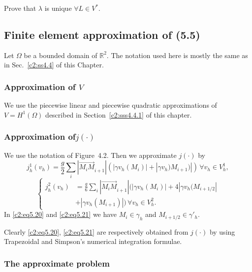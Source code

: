  \begin{exercise}\label{c2:exer5.2}%
Prove that $\lambda$ is unique $\forall L \in V^*$. 
  \end{exercise}  

 \subsection{Finite element approximation of (5.5)}\label{c2:ss5.4}
  Let $\Omega$ be a bounded domain of $\mathbb{R}^2$. The notation
  used here is mostly the same as in Sec.~\ref{c2:ss4.4} of this Chapter.  
\subsubsection{Approximation of $V$}\label{c2:sss5.4.1}
We use the piecewise  linear and
piecewise quadratic approximations of $V = H^1(\Omega)$ described in
Section~\ref{c2:sss4.4.1} of this chapter. 
\subsubsection{Approximation of$j (\cdot)$}\label{c2:sss5.4.2} 
We use the notation of  Figure~4.2. Then we approximate $j(\cdot)$ by  
\begin{equation}
j^1_h(v_h) = \frac{g}{2} \sum_i |\overrightarrow{M_i M}_{i+1}|
(|\gamma v_h(M_i)  | + |\gamma v_h )M_{i+1})|)\, \forall  v_h \in
V^1_h, \tag{5.20}\label{c2:eq5.20}  
\end{equation} 
\begin{equation}
\begin{cases}
j^2_h (v_h) & = \frac{g}{6}\sum_i |\overrightarrow{M_i M}_{i+1}| (
|\gamma v_h (M_i) |+4 | \gamma v_h (M_{i+1/2}| \\ 
 & + |\gamma v_h (M_{i+1}) |)\, \forall  v_h \in
V^2_h. \tag{5.21}\label{c2:eq5.21}  
\end{cases}
 \end{equation} 
 In \eqref{c2:eq5.20} and \eqref{c2:eq5.21} we have $M_i \in
 \gamma_h$ and $M_{i+1/2} \in \gamma'_h$. 

 \begin{remark}\label{c2:rem5.5}%
 Clearly \eqref{c2:eq5.20}, \eqref{c2:eq5.21} are respectively
 obtained from $j(\cdot)$ by  using Trapezoidal and Simpson's
 numerical integration formulae.  
 \end{remark} 

\subsubsection{The approximate problem}\label{c2:sss5.4.3}

